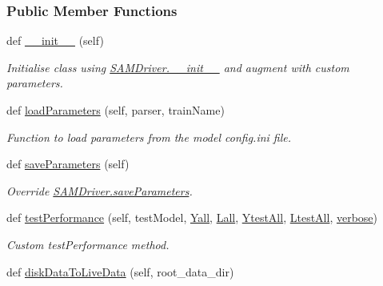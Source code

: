 \subsubsection*{Public Member Functions}
\begin{DoxyCompactItemize}
\item 
def \hyperlink{group__icubclient__SAM__Drivers_a1d8d40aaf3d8688bb50f784c19615368}{\+\_\+\+\_\+init\+\_\+\+\_\+} (self)
\begin{DoxyCompactList}\small\item\em Initialise class using \hyperlink{group__icubclient__SAM__Drivers_gac35ec3eea80d1fb5704758a9c53267a1}{S\+A\+M\+Driver.\+\_\+\+\_\+init\+\_\+\+\_\+} and augment with custom parameters. \end{DoxyCompactList}\item 
def \hyperlink{group__icubclient__SAM__Drivers_a51c7b0fd9952b5cb0d347912ce12d14e}{load\+Parameters} (self, parser, train\+Name)
\begin{DoxyCompactList}\small\item\em Function to load parameters from the model config.\+ini file. \end{DoxyCompactList}\item 
def \hyperlink{group__icubclient__SAM__Drivers_a12a86e98b3d5335ef56bcd3f6d048f81}{save\+Parameters} (self)
\begin{DoxyCompactList}\small\item\em Override \hyperlink{group__icubclient__SAM__Drivers_gac6f300d2daf748b11b28802574b6f5e8}{S\+A\+M\+Driver.\+save\+Parameters}. \end{DoxyCompactList}\item 
def \hyperlink{group__icubclient__SAM__Drivers_a9e07c7922ed5de8fed5ec837d191743f}{test\+Performance} (self, test\+Model, \hyperlink{group__icubclient__SAM__Drivers_ga99651a34f71273b720039e8f4d4b03a4}{Yall}, \hyperlink{group__icubclient__SAM__Drivers_ga4b259685c2b7fddfc554f75eee45389a}{Lall}, \hyperlink{group__icubclient__SAM__Drivers_ga61bc4612a1dd3b5d593798bb7e338c81}{Ytest\+All}, \hyperlink{group__icubclient__SAM__Drivers_ga47bb2e79cf8b5f8e071ab6208cf25dd0}{Ltest\+All}, \hyperlink{group__icubclient__SAM__Drivers_ga48cfefc6532ba606936b9fd7f3156da8}{verbose})
\begin{DoxyCompactList}\small\item\em Custom test\+Performance method. \end{DoxyCompactList}\item 
def \hyperlink{group__icubclient__SAM__Drivers_abfdb7d58b7dde75f1e9dfdbd1c053264}{disk\+Data\+To\+Live\+Data} (self, root\+\_\+data\+\_\+dir)

\end{DoxyCompactItemize}
